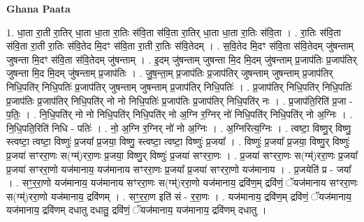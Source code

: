 \documentclass[17pt]{extarticle}
\begin{document}
\textbf{Ghana Paata } \newline

1. धा॒ता रा॒ती रा॒तिर् धा॒ता धा॒ता रा॒तिः स॑वि॒ता स॑वि॒ता रा॒तिर् धा॒ता धा॒ता रा॒तिः स॑वि॒ता । . रा॒तिः स॑वि॒ता स॑वि॒ता रा॒ती रा॒तिः स॑वि॒तेद मि॒दꣳ स॑वि॒ता रा॒ती रा॒तिः स॑वि॒तेदम् । . स॒वि॒तेद मि॒दꣳ स॑वि॒ता स॑वि॒तेदम् जु॑षन्ताम् जुषन्ता मि॒दꣳ स॑वि॒ता स॑वि॒तेदम् जु॑षन्ताम् । . इ॒दम् जु॑षन्ताम् जुषन्ता मि॒द मि॒दम् जु॑षन्ताम् प्र॒जाप॑तिः प्र॒जाप॑तिर् जुषन्ता मि॒द मि॒दम् जु॑षन्ताम् प्र॒जाप॑तिः । . जु॒ष॒न्ता॒म् प्र॒जाप॑तिः प्र॒जाप॑तिर् जुषन्ताम् जुषन्ताम् प्र॒जाप॑तिर् निधि॒पति॑र् निधि॒पतिः॑ प्र॒जाप॑तिर् जुषन्ताम् जुषन्ताम् प्र॒जाप॑तिर् निधि॒पतिः॑ । . प्र॒जाप॑तिर् निधि॒पति॑र् निधि॒पतिः॑ प्र॒जाप॑तिः प्र॒जाप॑तिर् निधि॒पति॑र् नो नो निधि॒पतिः॑ प्र॒जाप॑तिः प्र॒जाप॑तिर् निधि॒पति॑र् नः । . प्र॒जाप॑ति॒रिति॑ प्र॒जा - प॒तिः॒ । . नि॒धि॒पति॑र् नो नो निधि॒पति॑र् निधि॒पति॑र् नो अ॒ग्नि र॒ग्निर् नो॑ निधि॒पति॑र् निधि॒पति॑र् नो अ॒ग्निः । . नि॒धि॒पति॒रिति॑ निधि - पतिः॑ । . नो॒ अ॒ग्नि र॒ग्निर् नो॑ नो अ॒ग्निः । . अ॒ग्निरित्य॒ग्निः । . त्वष्टा॒ विष्णु॒र् विष्णु॒ स्त्वष्टा॒ त्वष्टा॒ विष्णुः॑ प्र॒जया᳚ प्र॒जया॒ विष्णु॒ स्त्वष्टा॒ त्वष्टा॒ विष्णुः॑ प्र॒जया᳚ । . विष्णुः॑ प्र॒जया᳚ प्र॒जया॒ विष्णु॒र् विष्णुः॑ प्र॒जया॑ सꣳररा॒णः स(ग्म्॑)ररा॒णः प्र॒जया॒ विष्णु॒र् विष्णुः॑ प्र॒जया॑ सꣳररा॒णः । . प्र॒जया॑ सꣳररा॒णः स(ग्म्॑)ररा॒णः प्र॒जया᳚ प्र॒जया॑ सꣳररा॒णो यज॑मानाय॒ यज॑मानाय सꣳररा॒णः प्र॒जया᳚ प्र॒जया॑ सꣳररा॒णो यज॑मानाय । . प्र॒जयेति॑ प्र - जया᳚ । . सꣳ॒॒र॒रा॒णो यज॑मानाय॒ यज॑मानाय सꣳररा॒णः स(ग्म्॑)ररा॒णो यज॑मानाय॒ द्रवि॑ण॒म् द्रवि॑णं॒ ॅयज॑मानाय सꣳररा॒णः स(ग्म्॑)ररा॒णो यज॑मानाय॒ द्रवि॑णम् । . सꣳ॒॒र॒रा॒ण इति॑ सं - र॒रा॒णः । . यज॑मानाय॒ द्रवि॑ण॒म् द्रवि॑णं॒ ॅयज॑मानाय॒ यज॑मानाय॒ द्रवि॑णम् दधातु दधातु॒ द्रवि॑णं॒ ॅयज॑मानाय॒ यज॑मानाय॒ द्रवि॑णम् दधातु । \newline
\end{document}

